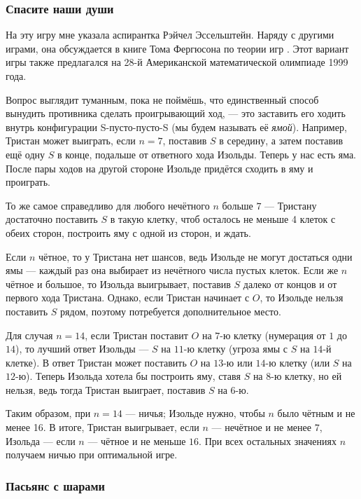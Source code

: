 \subsubsection*{Спасите наши души}

На эту игру мне указала аспирантка Рэйчел Эссельштейн.
Наряду с другими играми, она обсуждается в книге Тома Фергюсона по теории игр \cite{ferguson}.
Этот вариант игры также предлагался на 28-й Американской математической олимпиаде 1999 года.

Вопрос выглядит туманным, пока не поймёшь, что единственный способ вынудить противника сделать проигрывающий ход, --- это заставить его ходить внутрь конфигурации S-пусто-пусто-S (мы будем называть её \emph{ямой}).
Например, Тристан может выиграть, если $n = 7$, поставив $S$ в середину, а затем поставив ещё одну $S$ в конце, подальше от ответного хода Изольды.
Теперь у нас есть яма.
После пары ходов на другой стороне Изольде придётся сходить в яму и проиграть.

То же самое справедливо для любого нечётного $n$ больше $7$ --- Тристану достаточно поставить $S$ в такую клетку, чтоб осталось не меньше 4 клеток с обеих сторон, построить яму с одной из сторон, и ждать.

Если $n$ чётное, то у Тристана нет шансов, ведь Изольде не могут достаться одни ямы --- каждый раз она выбирает из нечётного числа пустых клеток.
Если же $n$ чётное и большое, то Изольда выигрывает, поставив $S$ далеко от концов и от первого хода Тристана.
Однако, если Тристан начинает с $O$, то Изольде нельзя поставить $S$ рядом, поэтому потребуется дополнительное место.

Для случая $n = 14$, если Тристан поставит $O$ на $7$-ю клетку (нумерация от $1$ до $14$), то лучший ответ Изольды --- $S$ на $11$-ю клетку (угроза ямы с $S$ на $14$-й клетке).
В ответ Тристан может поставить $O$ на $13$-ю или $14$-ю клетку (или $S$ на $12$-ю). 
Теперь Изольда хотела бы построить яму, ставя $S$ на $8$-ю клетку, но ей нельзя, ведь тогда Тристан выиграет, поставив $S$ на $6$-ю.

Таким образом, при $n = 14$ --- ничья;
Изольде нужно, чтобы $n$ было чётным и не менее 16.
В итоге, Тристан выигрывает, если $n$ --- нечётное и не менее $7$,
Изольда --- если $n$ --- чётное и не меньше $16$.
При всех остальных значениях $n$ получаем ничью при оптимальной игре.

\subsubsection*{Пасьянс с шарами}

